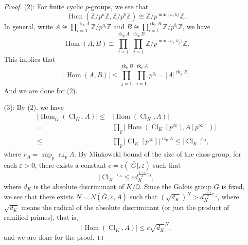 \documentclass[10pt,a4paper]{amsart}
\begin{document}
\begin{proof}
	(2):
	For finite cyclic $p$-groups, we see that
	\begin{equation*}
		\operatorname{Hom}(\mathbb{Z}/p^a\mathbb{Z},\mathbb{Z}/p^b\mathbb{Z})\cong\mathbb{Z}/p^{\min\{a,b\}}\mathbb{Z}.
	\end{equation*}
	In general, write $A\cong\prod_{i=1}^{\operatorname{rk}_p A}\mathbb{Z}/p^{a_i}\mathbb{Z}$ and $B\cong\prod_{i=1}^{\operatorname{rk}_p B}\mathbb{Z}/p^{b_i}\mathbb{Z}$, we have
	\begin{equation*}
		\operatorname{Hom}(A,B)\cong\prod_{i=1}^{\operatorname{rk}_p A}\prod_{j=1}^{\operatorname{rk}_p B}\mathbb{Z}/p^{\min\{a_i,b_j\}}\mathbb{Z}.
	\end{equation*}
	This implies that
	\begin{equation*}
		\lvert\operatorname{Hom}(A,B)\rvert\leq\prod_{j=1}^{\operatorname{rk}_p B}\prod_{i=1}^{\operatorname{rk}_p A}p^{a_i}=\lvert A\rvert^{\operatorname{rk}_p B}.
	\end{equation*}
	And we are done for (2).
	
	(3):
	By (2), we have
	\begin{equation*}
		\begin{aligned}
			\lvert\operatorname{Hom}_{\bar{G}}(\operatorname{Cl}_K,A)\rvert\leq&\lvert\operatorname{Hom}(\operatorname{Cl}_K,A)\rvert\\
			=&\prod_{p}\lvert\operatorname{Hom}(\operatorname{Cl}_K[p^\infty],A[p^\infty])\rvert
			\\
			\leq&\prod_p\lvert\operatorname{Cl}_K[p^\infty]\rvert^{\operatorname{rk}_p A}
			\leq\lvert\operatorname{Cl}_K\rvert^{r_A},
		\end{aligned}
	\end{equation*}
	where $r_A=\sup_p\operatorname{rk}_pA$.
	By Minkowski bound of the size of the class group, for each $\varepsilon>0$, there exists a constant $c=c(\lvert \bar{G}\rvert,\varepsilon)$ such that
	\begin{equation*}
		\lvert\operatorname{Cl}_K\rvert^{r_A}\leq c d_K^{\frac{1+\varepsilon}{2}r_A},
	\end{equation*}
	where $d_K$ is the absolute discriminant of $K/\mathbb{Q}$.
	Since the Galois group $\bar{G}$ is fixed, we see that there exists $N=N(\bar{G},\varepsilon,A)$ such that $(\sqrt{d_K})^N>d_K^{\frac{1+\varepsilon}{2}r_A}$, where $\sqrt{d_K}$ means the radical of the absolute discriminant (or just the product of ramified primes), that is, 
	\begin{equation*}
		\lvert\operatorname{Hom}(\operatorname{Cl}_K,A)\rvert\leq c\sqrt{d_K}^{N},
	\end{equation*}
	and we are done for the proof.
\end{proof}
\end{document}
